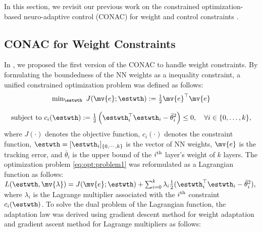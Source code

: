 \documentclass[conference]{IEEEtran}
\begin{document}
In this section, we revisit our previous work on the constrained optimization-based neuro-adaptive control (CONAC) for weight \cite{Ryu:2024aa} and control constraints \cite{Ryu:2024ab,Ryu:2025aa}.

\subsection{CONAC for Weight Constraints}

In \cite{Ryu:2024aa}, we proposed the first version of the CONAC to handle weight constraints.
By formulating the boundedness of the NN weights as a inequality constraint, a unified constrained optimization problem was defined as follows:
\begin{equation}
    \begin{matrix}
        \min_{\estwth} \ J(\mv{e};\estwth):= 
        \tfrac{1}{2} \mv{e}^\top \mv{e}
        \\ \\
        \begin{aligned}
        \text{subject to }&
            c_i(\estwth)
            :=
            \tfrac{1}{2}
            \left(
                \estwth_i^\top \estwth_i - {\bar\theta}_i^2
            \right)
        \le0, \quad \forall i\in\{0,\ldots,k\} \\
        \end{aligned}
        ,
    \end{matrix}
    \label{eq:opt:problem1}
\end{equation}
where $J(\cdot)$ denotes the objective function, $c_i(\cdot)$ denotes the constraint function, $\estwth=[\estwth_i]_{\{0,\cdots,k\}}$ is the vector of NN weights, $\mv{e}$ is the tracking error, and $\bar\theta_i$ is the upper bound of the $i\textsuperscript{th}$ layer's weight of $k$ layers.
The optimization problem \eqref{eq:opt:problem1} was reformulated as a Lagrangian function as follows:
$
    L(\estwth,\mv{\lambda}) = J(\mv{e};\estwth) + \sum_{i=0}^k \lambda_i \tfrac{1}{2}(\estwth_i^\top \estwth_i - {\bar\theta}_i^2)
    ,
$
where $\lambda_i$ is the Lagrange multiplier associated with the $i\textsuperscript{th}$ constraint $c_i(\estwth)$.
To solve the dual problem of the Lagrangian function, the adaptation law was derived using gradient descent method for weight adaptation and gradient ascent method for Lagrange multipliers as follows:
\end{document}
